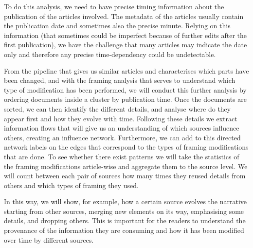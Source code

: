 To do this analysis, we need to have precise timing information about the publication of the articles involved.
The metadata of the articles usually contain the publication date and sometimes also the precise minute.
Relying on this information (that sometimes could be imperfect because of further edits after the first publication), we have the challenge that many articles may indicate the date only and therefore any precise time-dependency could be undetectable.

From the pipeline that gives us similar articles and characterises which parts have been changed, and with the framing analysis that serves to understand which type of modification has been performed, we will conduct this further analysis by ordering documents inside a cluster by publication time.
Once the documents are sorted, we can then identify the different details, and analyse where do they appear first and how they evolve with time.
Following these details we extract information flows that will give us an understanding of which sources influence others, creating an influence network.
Furthermore, we can add to this directed network labels on the edges that correspond to the types of framing modifications that are done.
To see whether there exist patterns we will take the statistics of the framing modifications article-wise and aggregate them to the source level.
We will count between each pair of sources how many times they reused details from others and which types of framing they used.

In this way, we will show, for example, how a certain source evolves the narrative starting from other sources, merging new elements on its way, emphasising some details, and dropping others.
This is important for the readers to understand the provenance of the information they are consuming and how it has been modified over time by different sources.







